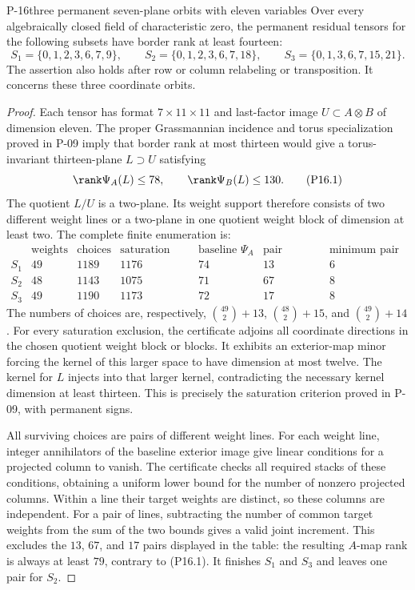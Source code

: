 \begin{finding}{P-16}{three permanent seven-plane orbits with eleven variables}
Over every algebraically closed field of characteristic zero, the
permanent residual tensors for the following subsets have border rank
at least fourteen:
\[
 S_1=\{0,1,2,3,6,7,9\},\qquad
 S_2=\{0,1,2,3,6,7,18\},\qquad
 S_3=\{0,1,3,6,7,15,21\}.
\]
The assertion also holds after row or column relabeling or transposition.
It concerns these three coordinate orbits.
\end{finding}
\begin{proof}
Each tensor has format $7\times11\times11$ and last-factor image
$U\subset A\otimes B$ of dimension eleven. The proper Grassmannian
incidence and torus specialization proved in P-09 imply that border
rank at most thirteen would give a torus-invariant thirteen-plane
$L\supset U$ satisfying
\[
 \rank\Psi_A(L)\le78,\qquad \rank\Psi_B(L)\le130.
 \tag{P16.1}
\]
The quotient $L/U$ is a two-plane. Its weight support therefore consists
of two different weight lines or a two-plane in one quotient weight
block of dimension at least two. The complete finite enumeration is:
\[
\begin{array}{c|r|r|r|r|r|r}
 &\text{weights}&\text{choices}&\text{saturation exclusions}
 &\text{baseline }\Psi_A&\text{pair exclusions}&\text{minimum pair increment}\\\hline
 S_1&49&1189&1176&74&13&6\\
 S_2&48&1143&1075&71&67&8\\
 S_3&49&1190&1173&72&17&8
\end{array}
\]
The numbers of choices are, respectively,
$\binom{49}{2}+13$, $\binom{48}{2}+15$, and
$\binom{49}{2}+14$. For every saturation exclusion, the certificate
adjoins all coordinate directions in the chosen quotient weight block
or blocks. It exhibits an exterior-map minor forcing the kernel of
this larger space to have dimension at most twelve. The kernel for
$L$ injects into that larger kernel, contradicting the necessary
kernel dimension at least thirteen. This is precisely the saturation
criterion proved in P-09, with permanent signs.

All surviving choices are pairs of different weight lines. For each
weight line, integer annihilators of the baseline exterior image give
linear conditions for a projected column to vanish. The certificate
checks all required stacks of these conditions, obtaining a uniform
lower bound for the number of nonzero projected columns. Within a line
their target weights are distinct, so these columns are independent.
For a pair of lines, subtracting the number of common target weights
from the sum of the two bounds gives a valid joint increment. This
excludes the $13$, $67$, and $17$ pairs displayed in the table: the
resulting $A$-map rank is always at least $79$, contrary to (P16.1).
It finishes $S_1$ and $S_3$ and leaves one pair for $S_2$.


\end{proof}
